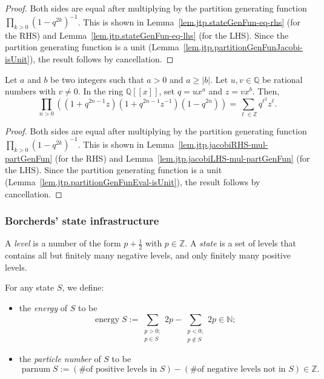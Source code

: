\begin{proof}
Both sides are equal after multiplying by the partition generating
function $\prod_{k>0}(1-q^{2k})^{-1}$. This is shown in
Lemma~\ref{lem.jtp.stateGenFun-eq-rhs} (for the RHS) and
Lemma~\ref{lem.jtp.stateGenFun-eq-lhs} (for the LHS). Since the
partition generating function is a unit
(Lemma~\ref{lem.jtp.partitionGenFunJacobi-isUnit}), the result follows
by cancellation.
\end{proof}

\begin{theorem}
\label{thm.pars.jtp2}
\leantarget
\leanok
Let $a$ and $b$
be two integers such that $a>0$ and $a\geq\left\vert b\right\vert $. Let
$u,v\in\mathbb{Q}$ be rational numbers with $v\neq0$. In the ring
$\mathbb{Q}\left[\left[  x\right]\right]  $, set $q=ux^{a}$ and $z=vx^{b}$.
Then,
\[
\prod_{n>0}\left(  \left(  1+q^{2n-1}z\right)  \left(  1+q^{2n-1}
z^{-1}\right)  \left(  1-q^{2n}\right)  \right)  =\sum_{\ell\in\mathbb{Z}
}q^{\ell^{2}}z^{\ell}.
\]
\end{theorem}

\begin{proof}
Both sides are equal after multiplying by the partition generating
function $\prod_{k>0}(1-q^{2k})^{-1}$. This is shown in
Lemma~\ref{lem.jtp.jacobiRHS-mul-partGenFun} (for the RHS) and
Lemma~\ref{lem.jtp.jacobiLHS-mul-partGenFun} (for the LHS). Since the
partition generating function is a unit
(Lemma~\ref{lem.jtp.partitionGenFunEval-isUnit}), the result follows
by cancellation.
\end{proof}

\subsubsection{Borcherds' state infrastructure}

\begin{definition}
\label{def.jtp.state}
\leanhelper
\leanok
A \emph{level} is a number of the form $p+\frac{1}{2}$ with
$p\in\mathbb{Z}$. A \emph{state} is a set of levels that contains
all but finitely many negative levels, and only finitely many positive levels.

For any state $S$, we define:
\begin{itemize}
\item the \emph{energy} of $S$ to be
\[
\operatorname{energy}S:=\sum_{\substack{p>0;\\p\in S}}2p
-\sum_{\substack{p<0;\\p\notin S}}2p \in\mathbb{N};
\]

\item the \emph{particle number} of $S$ to be
\[
\operatorname{parnum}S:=\left(\text{\# of positive levels in } S\right)
-\left(\text{\# of negative levels not in } S\right)\in\mathbb{Z}.
\]
\end{itemize}
\end{definition}


